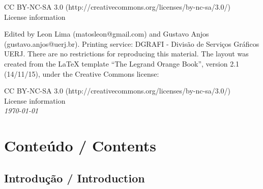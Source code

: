 \documentclass[11pt,a4paper]{book} %
\begin{document}
CC BY-NC-SA 3.0 (http://creativecommons.org/licenses/by-nc-sa/3.0/)\\ %
License information

\noindent Edited by Leon Lima (matosleon@gmail.com) and Gustavo Anjos
(gustavo.anjos@uerj.br). Printing service: DGRAFI - Divisão de Serviços
Gráficos UERJ. There are no restrictions for reproducing this material.
The layout was created from the {\LaTeX} template ``The Legrand Orange
Book'', version 2.1 (14/11/15), under the Creative Commons license: 

CC BY-NC-SA 3.0 (http://creativecommons.org/licenses/by-nc-sa/3.0/)\\ %
License information\\ %

\noindent \textit{\today} %


%
%
%
%

\part{Conteúdo / Contents}

\chapter{Introdução / Introduction}

\end{document}
